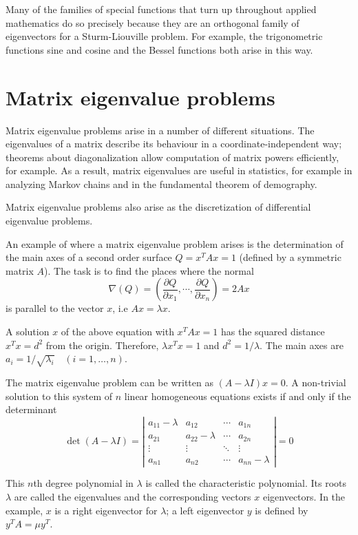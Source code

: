 \documentclass{article}
\newcommand{\del}{\nabla}
\begin{document}
Many of the families of special functions that turn up throughout applied mathematics do so precisely because they are an orthogonal family of eigenvectors for a Sturm-Liouville problem.  For example, the trigonometric functions sine and cosine and the Bessel functions both arise in this way.

\section*{Matrix eigenvalue problems}

Matrix eigenvalue problems arise in a number of different situations.  The eigenvalues of a matrix describe its behaviour in a coordinate-independent way; theorems about diagonalization allow computation of matrix powers efficiently, for example.  As a result, matrix eigenvalues are useful in statistics, for example in analyzing Markov chains and in the fundamental theorem of demography.

Matrix eigenvalue problems also arise as the discretization of differential eigenvalue problems.

An example of where a matrix eigenvalue problem arises is the determination of the main axes of a second order surface $Q=x^TAx=1$ (defined by a symmetric matrix $A$). The task is to find the places where the normal
\[
\del (Q) = \left(\frac{\partial Q}{\partial x_1}, \cdots , \frac{\partial Q}{\partial x_n}\right) = 2 A x
\]
is parallel to the vector $x$, i.e $Ax=\lambda x$.

A solution $x$ of the above equation with $x^TAx=1$ has the squared distance $x^Tx=d^2$ from the origin. Therefore, $\lambda x^Tx =1$ and $d^2=1/\lambda$. The main axes are $a_i = 1/\sqrt{\lambda_i}\quad (i=1,\ldots,n)$.

The matrix eigenvalue problem can be written as $(A-\lambda I)x=0$.
A non-trivial solution to this system of $n$ linear homogeneous equations exists if and only if the determinant
\[
\det(A-\lambda I) = 
\left|\begin{matrix}
 a_{11}-\lambda & a_{12} & \cdots & a_{1n} \\
 a_{21} & a_{22}-\lambda & \cdots & a_{2n} \\
 \vdots & \vdots & \ddots & \vdots \\
 a_{n1} & a_{n2} & \cdots & a_{nn}-\lambda
\end{matrix} \right| = 0
\]

This $n$th degree polynomial in $\lambda$ is called the characteristic polynomial. Its roots $\lambda$ are called the eigenvalues and the corresponding vectors $x$ eigenvectors. In the example, $x$ is a right eigenvector for $\lambda$; a left eigenvector $y$ is defined by $y^TA=\mu y^T$.
\end{document}
